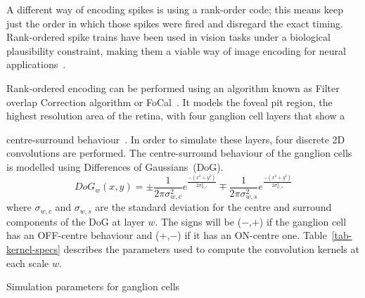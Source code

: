 A different way of encoding spikes is using a rank-order code; this means
keep just the order in which those spikes were fired and disregard the exact timing. Rank-ordered spike trains have been used in vision tasks under a biological plausibility constraint, making them a viable way of image encoding for neural applications~\citep{van2001rate,sen2009evaluating,masmoudi2010novel}.

Rank-ordered encoding can be performed using an algorithm known as 
{Filter overlap Correction algorithm} or FoCal~\citep{sen2009evaluating}. It models the foveal pit region, the highest resolution area of the retina, with four ganglion cell layers that show a{centre-surround behaviour~\citep{kolb2003retina}. In order to simulate these layers, four discrete 2D convolutions are performed. The centre-surround behaviour of the ganglion cells is modelled using Differences of Gaussians~(DoG). 
\begin{equation}
\label{eq-dog}
DoG_w(x,y) = \pm\frac{1}{2\pi\sigma_{w,c}^2}e^{\frac{-(x^2 + y^2)}{2\sigma_{w,c}^2}}
\mp\frac{1}{2\pi\sigma_{w,s}^2}e^{\frac{-(x^2 + y^2)}{2\sigma_{w,s}^2}}
\end{equation}
where $\sigma_{w,c}$ and $\sigma_{w,s}$ are the standard deviation for the 
centre and surround components of the DoG at layer $w$. The signs 
will be ($-$,$+$) if the ganglion cell has an OFF-centre behaviour and 
($+$,$-$) if it has an ON-centre one. Table~\ref{tab-kernel-specs} 
describes the parameters used to compute the convolution kernels at each 
scale $w$.

\begin{table}[htb]
 \caption{Simulation parameters for ganglion cells}
  \begin{center}


  \bgroup
  \def\arraystretch{1.4}
      

\end{center}
\end{table}}
